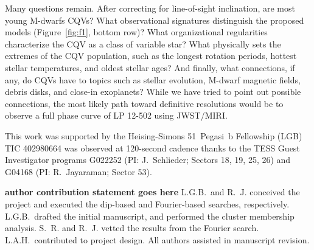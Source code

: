 \documentclass[11pt,twocolumn,tighten]{aastex63}
\begin{document}
Many questions remain.
After correcting for line-of-sight inclination, are
most young M-dwarfs CQVs?  What observational signatures distinguish
the proposed models (Figure~\ref{fig:f1}, bottom row)?  What
organizational regularities characterize the CQV as a class of
variable star?  What physically sets the extremes of the CQV population, such as
the longest rotation periods, hottest stellar temperatures, and oldest
stellar ages?  And finally, what connections, if any, do CQVs have to
topics such as stellar evolution, M-dwarf magnetic fields, debris
disks, and close-in exoplanets?
While we have tried to point out possible connections, the most
likely path toward definitive resolutions would be to observe a full
phase curve of LP 12-502 using JWST/MIRI.



\acknowledgments
This work was supported by the 
Heising-Simons 51~Pegasi~b Fellowship (LGB)
TIC 402980664 was observed at 120-second cadence thanks to the TESS Guest
Investigator programs G022252 (PI: J.~Schlieder; Sectors 18, 19, 25,
26) and G04168 (PI: R.~Jayaraman; Sector 53).

{\bf author contribution statement goes here}
L.G.B.~and R.~J. conceived the project and executed the
dip-based and Fourier-based searches, respectively.
L.G.B.~drafted the initial manuscript, and performed the cluster
membership analysis.
S.~R. and R.~J. vetted the results from the Fourier search.
L.A.H.~contributed to project design.
All authors assisted in manuscript revision.

\end{document}
